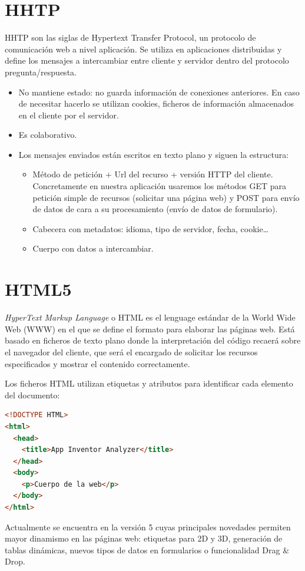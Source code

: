 \documentclass[a4paper, 12pt]{book}
\begin{document}
\section{HHTP} 
\label{sec:seccion5}
HHTP son las siglas de Hypertext Transfer Protocol, un protocolo de comunicación web a nivel aplicación. Se utiliza en aplicaciones distribuidas y define los mensajes a intercambiar entre cliente y servidor dentro del protocolo pregunta/respuesta.  
\begin{itemize}
	\item No mantiene estado: no guarda información de conexiones anteriores. En caso de necesitar hacerlo se utilizan cookies, ficheros de información almacenados en el cliente por el servidor. 
	\item Es colaborativo. 
	\item Los mensajes enviados están escritos en texto plano y siguen la estructura:
	\begin{itemize}
		\item Método de petición + Url del recurso + versión HTTP del cliente. Concretamente en nuestra aplicación usaremos los métodos GET para petición simple de recursos (solicitar una página web) y POST para envío de datos de cara a su procesamiento (envío de datos de formulario). 
		\item Cabecera con metadatos: idioma, tipo de servidor, fecha, cookie\ldots
		\item Cuerpo con datos a intercambiar.
	\end{itemize}	
\end{itemize}
\section{HTML5} 
\label{sec:seccion6}
\textit{HyperText Markup Language} o HTML es el lenguage estándar de la World Wide Web (WWW) en el que se define el formato para elaborar las páginas web. Está basado en ficheros de texto plano donde la interpretación del código recaerá sobre el navegador del cliente, que será el encargado de solicitar los recursos especificados y mostrar el contenido correctamente. 

Los ficheros HTML utilizan etiquetas y atributos para identificar cada elemento del documento:
\begin{lstlisting}[language=HTML]
<!DOCTYPE HTML> 
<html>
  <head>
    <title>App Inventor Analyzer</title>
  </head>
  <body>
    <p>Cuerpo de la web</p>
  </body>
</html>
\end{lstlisting}
Actualmente se encuentra en la versión 5 cuyas principales novedades permiten mayor dinamismo en las páginas web: etiquetas para 2D y 3D, generación de tablas dinámicas, nuevos tipos de datos en formularios o funcionalidad Drag \& Drop. 
\end{document}
